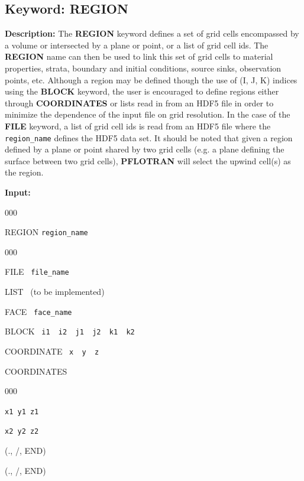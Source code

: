 \documentclass[12pt]{article}
\begin{document}
\newpage
\protect\hypertarget{target_region}{}


\subsection{Keyword: REGION}

{\noindent\bf Description:}
The {\bf REGION} keyword defines a set of grid cells encompassed by a volume or intersected by a plane or point, or a list of grid cell ids.  The {\bf REGION} name can then be used to link this set of grid cells to material properties, strata, boundary and initial conditions, source sinks, observation points, etc.  Although a region may be defined though the use of (I, J, K) indices using the {\bf BLOCK} keyword, the user is encouraged to define regions either through {\bf COORDINATES} or lists read in from an HDF5 file in order to minimize the dependence of the input file on grid resolution.  In the case of the {\bf FILE} keyword, a list of grid cell ids is read from an HDF5 file where the {\tt region\_name} defines the HDF5 data set.  It should be noted that given a region defined by a plane or point shared by two grid cells (e.g. a plane defining the surface between two grid cells), {\bf PFLOTRAN} will select the upwind cell(s) as the region.

{\noindent\bf Input:}

\begin{deflist}{000}
\item[REGION] {\tt region\_name}
\begin{deflist}{000}
\item[FILE] \ {\tt file\_name}
\item[LIST] \ (to be implemented)
\item[FACE] \ {\tt face\_name}
\item[BLOCK] \ {\tt i1 \ i2 \ j1 \ j2 \ k1 \ k2}
\item[COORDINATE] \ {\tt x \ y \ z}
\item[COORDINATES] ~
\begin{deflist}{000}
\item[\tt x1 y1 z1]
\item[\tt x2 y2 z2]
\end{deflist}
\item[(., /, END)]
\end{deflist}
\item[(., /, END)]
\end{deflist}
\end{document}
